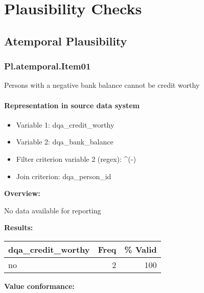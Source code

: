 \documentclass[
]{article}
\providecommand{\tightlist}{%
  \setlength{\itemsep}{0pt}\setlength{\parskip}{0pt}}
\begin{document}
\newpage

\hypertarget{plausibility-checks}{%
\section{Plausibility Checks}\label{plausibility-checks}}

\hypertarget{atemporal-plausibility}{%
\subsection{Atemporal Plausibility}\label{atemporal-plausibility}}

\hypertarget{pl.atemporal.item01}{%
\subsubsection{Pl.atemporal.Item01}\label{pl.atemporal.item01}}

Persons with a negative bank balance cannot be credit worthy

\hypertarget{representation-in-source-data-system-12}{%
\paragraph{Representation in source data
system}\label{representation-in-source-data-system-12}}

\begin{itemize}
\tightlist
\item
  Variable 1: dqa\_credit\_worthy
\item
  Variable 2: dqa\_bank\_balance
\item
  Filter criterion variable 2 (regex): \^{}(-)
\item
  Join criterion: dqa\_person\_id
\end{itemize}

\textbf{Overview:}

No data available for reporting

\textbf{Results:}\\

\begin{table}[H]
\centering
\begin{tabular}{l|r|r}
\hline
\textbf{dqa\_credit\_worthy} & \textbf{Freq} & \textbf{\% Valid}\\
\hline
no & 2 & 100\\
\hline
\end{tabular}
\end{table}

\textbf{Value conformance:}
\end{document}
